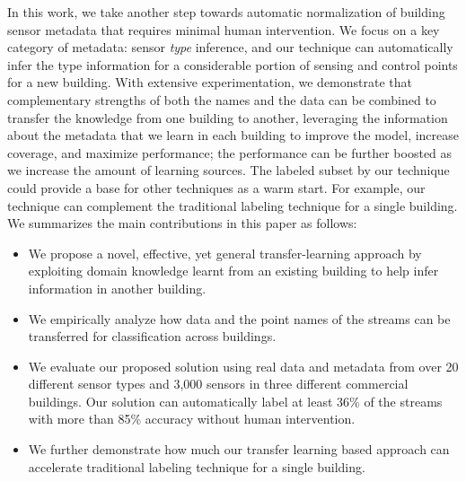 In this work, we take another step towards automatic normalization of building sensor metadata that requires minimal human intervention.
We focus on a key category of metadata: sensor {\it type} inference, and our technique can automatically infer the type information for a considerable portion of sensing and control points for a new building.
With extensive experimentation, we demonstrate that complementary strengths of both the names and the data
can be combined to transfer the knowledge from one building to another, leveraging the information
about the metadata that we learn in each building to improve the model, increase coverage, and maximize performance; the performance can be further boosted as we increase the amount of learning sources.
The labeled subset by our technique could provide a base for other techniques as a warm start.
For example, our technique can complement the traditional labeling technique for a single building.
We summarizes the main contributions in this paper as follows:
\begin{itemize}\itemsep1pt \parskip1pt 
\item We propose a novel, effective, yet general transfer-learning approach by exploiting domain knowledge learnt from an existing building to help infer information in another building.
\item We empirically analyze how data and the point names of the streams can be transferred for classification across buildings.
\item We evaluate our proposed solution using real data and metadata from over 20 different sensor types and 3,000 sensors in three different commercial buildings.  Our solution can automatically label at least 36\% of the streams with more than 85\% accuracy without human intervention.
\item We further demonstrate how much our transfer learning based approach can accelerate traditional labeling technique for a single building.
\end{itemize}
